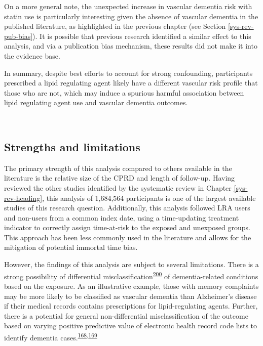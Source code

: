 \documentclass[a4paper, twoside]{templates/ociamthesis}
\begin{document}
On a more general note, the unexpected increase in vascular dementia risk with statin use is particularly interesting given the absence of vascular dementia in the published literature, as highlighted in the previous chapter (see Section \ref{sys-rev-pub-bias}). It is possible that previous research identified a similar effect to this analysis, and via a publication bias mechanism, these results did not make it into the evidence base.

In summary, despite best efforts to account for strong confounding, participants prescribed a lipid regulating agent likely have a different vascular risk profile that those who are not, which may induce a spurious harmful association between lipid regulating agent use and vascular dementia outcomes.

~

\hypertarget{strengths-and-limitations-1}{%
\subsection{Strengths and limitations}\label{strengths-and-limitations-1}}

The primary strength of this analysis compared to others available in the literature is the relative size of the CPRD and length of follow-up. Having reviewed the other studies identified by the systematic review in Chapter \ref{sys-rev-heading}, this analysis of 1,684,564 participants is one of the largest available studies of this research question. Additionally, this analysis followed LRA users and non-users from a common index date, using a time-updating treatment indicator to correctly assign time-at-risk to the exposed and unexposed groups. This approach has been less commonly used in the literature and allows for the mitigation of potential immortal time bias.

However, the findings of this analysis are subject to several limitations. There is a strong possibility of differential misclassification\textsuperscript{\protect\hyperlink{ref-porta2014dictionary}{200}} of dementia-related conditions based on the exposure. As an illustrative example, those with memory complaints may be more likely to be classified as vascular dementia than Alzheimer's disease if their medical records contains prescriptions for lipid-regulating agents. Further, there is a potential for general non-differential misclassification of the outcome based on varying positive predictive value of electronic health record code lists to identify dementia cases.\textsuperscript{\protect\hyperlink{ref-mcguinness2019validity}{168},\protect\hyperlink{ref-wilkinson2018}{169}}
\end{document}
